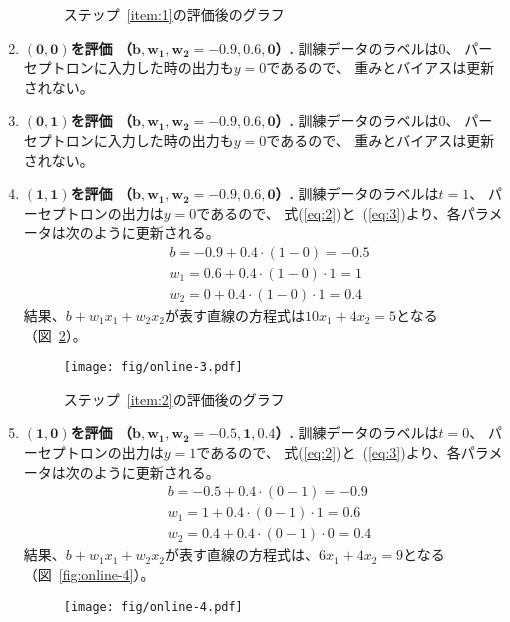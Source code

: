 \begin{enumerate}
\begin{figure}
    \caption{ステップ~\ref{item:1}の評価後のグラフ}
    \label{fig:online-2}
  \end{figure}
\item
  \textbf{$\boldsymbol{(0, 0)}$を評価
    （$\boldsymbol{b, w_1, w_2 = -0.9, 0.6, 0}$）. }
  訓練データのラベルは$0$、
  パーセプトロンに入力した時の出力も$y = 0$であるので、
  重みとバイアスは更新されない。
\item
  \textbf{$\boldsymbol{(0, 1)}$を評価
    （$\boldsymbol{b, w_1, w_2 = -0.9, 0.6, 0}$）. }
  訓練データのラベルは$0$、
  パーセプトロンに入力した時の出力も$y = 0$であるので、
  重みとバイアスは更新されない。
\item\label{item:2}
  \textbf{$\boldsymbol{(1, 1)}$を評価
    （$\boldsymbol{b, w_1, w_2 = -0.9, 0.6, 0}$）. }
  訓練データのラベルは$t = 1$、
  パーセプトロンの出力は$y = 0$であるので、
  式(\ref{eq:2})と~(\ref{eq:3})より、各パラメータは次のように更新される。
  \begin{align*}
    &
      b = -0.9 + 0.4\cdot (1 - 0) = - 0.5
    \\&
    w_1 = 0.6 + 0.4\cdot (1 - 0)\cdot 1 = 1
    \\&
    w_2 = 0 + 0.4\cdot (1 - 0)\cdot 1 = 0.4
  \end{align*}
  結果、$b + w_1x_1 + w_2x_2$が表す直線の方程式は$10 x_1 + 4 x_2 = 5$となる
  （図~\ref{fig:online-3}）。

  \begin{figure}
    \centering
    \texttt{[image: fig/online-3.pdf]}
    
    \caption{ステップ~\ref{item:2}の評価後のグラフ}
    \label{fig:online-3}
  \end{figure}
\item \label{item:3}
  \textbf{$\boldsymbol{(1, 0)}$を評価
    （$\boldsymbol{b, w_1, w_2 = -0.5, 1, 0.4}$）. }
  訓練データのラベルは$t = 0$、
  パーセプトロンの出力は$y = 1$であるので、
  式(\ref{eq:2})と~(\ref{eq:3})より、各パラメータは次のように更新される。
  \begin{align*}
    &
      b = -0.5 + 0.4\cdot (0 - 1) = - 0.9
    \\&
    w_1 = 1 + 0.4\cdot (0 - 1)\cdot 1 = 0.6
    \\&
    w_2 = 0.4 + 0.4\cdot (0 - 1)\cdot 0 = 0.4
  \end{align*}
  結果、$b + w_1x_1 + w_2x_2$が表す直線の方程式は、$6 x_1 + 4 x_2 = 9$となる
  （図~\ref{fig:online-4}）。

  \begin{figure}
    \centering
    \texttt{[image: fig/online-4.pdf]}
    

\end{figure}
\end{enumerate}
